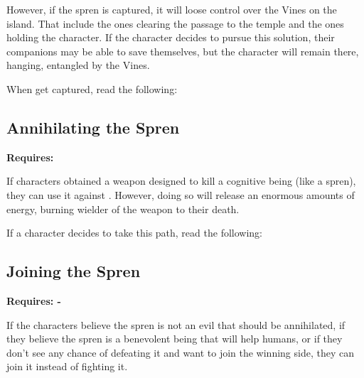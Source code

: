 However, if the spren is captured, it will loose control over the Vines on the island. That include the ones clearing the passage to the temple and the ones holding the character. If the character decides to pursue this solution, their companions may be able to save themselves, but the character will remain there, hanging, entangled by the Vines.

When \npcSprenVines{} get captured, read the following:


\subsection{Annihilating the Spren}
\textbf{Requires: \lootSprenDagger \\}

If characters obtained a weapon designed to kill a cognitive being (like a spren), they can use it against \npcSprenVines{}. However, doing so will release an enormous amounts of energy, burning wielder of the weapon to their death.

If a character decides to take this path, read the following:


\subsection{Joining the Spren}
\textbf{Requires: - \\}

If the characters believe the spren is not an evil that should be annihilated, if they believe the spren is a benevolent being that will help humans, or if they don't see any chance of defeating it and want to join the winning side, they can join it instead of fighting it.


